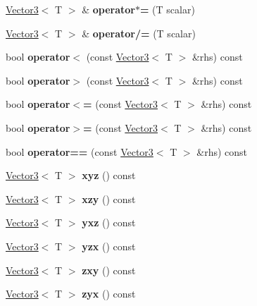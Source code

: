 \begin{DoxyCompactItemize}
\mbox{\hyperlink{class_vector3}{Vector3}}$<$ T $>$ \& {\bfseries operator$\ast$=} (T scalar)
\item 
\mbox{\label{class_vector3_a1fa0486589a5b3e0110902bb5ffa6d71}} 
\mbox{\hyperlink{class_vector3}{Vector3}}$<$ T $>$ \& {\bfseries operator/=} (T scalar)
\item 
\mbox{\label{class_vector3_ae62b088c2abf8ad6620d83565812ad60}} 
bool {\bfseries operator$<$} (const \mbox{\hyperlink{class_vector3}{Vector3}}$<$ T $>$ \&rhs) const
\item 
\mbox{\label{class_vector3_a87afbd96a97adff42c58bde870af47c4}} 
bool {\bfseries operator$>$} (const \mbox{\hyperlink{class_vector3}{Vector3}}$<$ T $>$ \&rhs) const
\item 
\mbox{\label{class_vector3_ac7cd56bfa861b5f99b3891f220f86d44}} 
bool {\bfseries operator$<$=} (const \mbox{\hyperlink{class_vector3}{Vector3}}$<$ T $>$ \&rhs) const
\item 
\mbox{\label{class_vector3_a9c0fd2c3f2cce9af0711f9ea40bff86a}} 
bool {\bfseries operator$>$=} (const \mbox{\hyperlink{class_vector3}{Vector3}}$<$ T $>$ \&rhs) const
\item 
\mbox{\label{class_vector3_a4206accf1c00e63b0181a56a32ba3c01}} 
bool {\bfseries operator==} (const \mbox{\hyperlink{class_vector3}{Vector3}}$<$ T $>$ \&rhs) const
\item 
\mbox{\label{class_vector3_a19844da39de7a26862856c7d12a009ca}} 
\mbox{\hyperlink{class_vector3}{Vector3}}$<$ T $>$ {\bfseries xyz} () const
\item 
\mbox{\label{class_vector3_a890a30bec732a65aaae386eb21d393df}} 
\mbox{\hyperlink{class_vector3}{Vector3}}$<$ T $>$ {\bfseries xzy} () const
\item 
\mbox{\label{class_vector3_ab026847d50c092c8ccf5c5314edca3db}} 
\mbox{\hyperlink{class_vector3}{Vector3}}$<$ T $>$ {\bfseries yxz} () const
\item 
\mbox{\label{class_vector3_a678d9ca488ba19d592965d0094bd685f}} 
\mbox{\hyperlink{class_vector3}{Vector3}}$<$ T $>$ {\bfseries yzx} () const
\item 
\mbox{\label{class_vector3_a325fdcf29fb440716dcb22583822e3b4}} 
\mbox{\hyperlink{class_vector3}{Vector3}}$<$ T $>$ {\bfseries zxy} () const
\item 
\mbox{\label{class_vector3_a43ee17c0dffc0290b18db9464c802be9}} 
\mbox{\hyperlink{class_vector3}{Vector3}}$<$ T $>$ {\bfseries zyx} () const
\end{DoxyCompactItemize}
